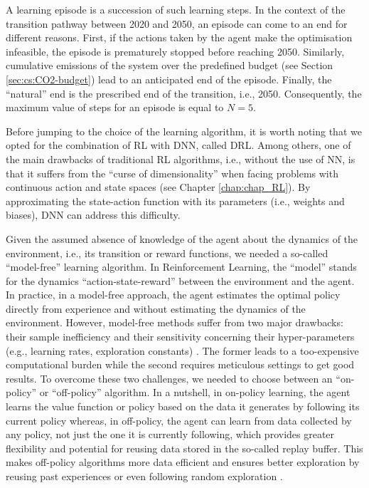 \documentclass[11pt,twoside,a4paper,english]{article}
\def\eg{e.g., }
\def\ie{i.e., }
\begin{document}
A learning episode is a succession of such learning steps. In the context of the transition pathway between 2020 and 2050, an episode can come to an end for different reasons. First, if the actions taken by the agent make the optimisation infeasible, the episode is prematurely stopped before reaching 2050. Similarly, cumulative emissions of the system over the predefined  budget (see Section \ref{sec:cs:CO2-budget}) lead to an anticipated end of the episode. Finally, the ``natural'' end is the prescribed end of the transition, \ie 2050. Consequently, the maximum value of steps for an episode is equal to $N=5$. 

Before jumping to the choice of the learning algorithm, it is worth noting that we opted for the combination of \gls{RL} with \gls{DNN}, called \gls{DRL}. Among others, one of the main drawbacks of traditional \gls{RL} algorithms, \ie without the use of \gls{NN},  is that it suffers from the ``curse of dimensionality'' when facing problems with continuous action and state spaces (see Chapter \ref{chap:chap_RL}). By approximating the state-action function with its parameters (\ie weights and biases), \gls{DNN} can address this difficulty. 

Given the assumed absence of knowledge of the agent about the dynamics of the environment, \ie its transition or reward functions, we needed a so-called ``model-free'' learning algorithm. In Reinforcement Learning, the ``model'' stands for the dynamics ``action-state-reward'' between the environment and the agent. In practice, in a model-free approach, the agent estimates the optimal policy directly from experience and without estimating the dynamics of the environment. However, model-free methods suffer from two major drawbacks: their sample inefficiency and their sensitivity concerning their hyper-parameters (\eg learning rates, exploration constants) \cite{haarnoja2018soft}. The former leads to a too-expensive computational burden while the second requires meticulous settings to get good results.  To overcome these two challenges, we needed to choose between an ``on-policy'' or ``off-policy'' algorithm. In a nutshell, in on-policy learning, the agent learns the value function or policy based on the data it generates by following its current policy whereas, in off-policy, the agent can learn from data collected by any policy, not just the one it is currently following, which provides greater flexibility and potential for reusing data stored in the so-called replay buffer. This makes off-policy algorithms more data efficient and ensures better exploration by reusing past experiences or even following random exploration \cite{haarnoja2018soft}.
\end{document}
